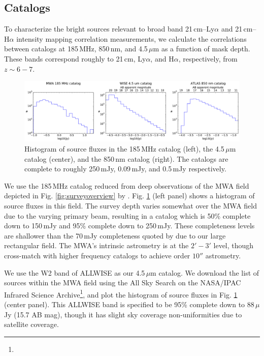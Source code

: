 \documentclass[numberedappendix]{emulateapj}
\begin{document}
\subsection{Catalogs}
\label{sec:catalogs}

To characterize the bright sources relevant to broad band  21\,cm--Ly$\alpha$ and  21\,cm--H$\alpha$ intensity mapping correlation measurements, we calculate the correlations between catalogs at 185\,MHz, 850\,nm, and 4.5\,$\mu$m as a function of mask depth. These bands correspond roughly to 21\,cm, Ly$\alpha$, and H$\alpha$, respectively, from $z\sim6-7$. 

\begin{figure}[t]
\centering
\includegraphics[width=6.5in]{catalog_histograms.pdf}
\caption[Histogram of source fluxes in the 185\,MHz, 850\,nm, and 4.5\,$\mu$m catalogs.]{Histogram of source fluxes in the 185\,MHz catalog (left), the 4.5\,$\mu$m catalog (center), and the 850\,nm catalog (right). The catalogs are complete to roughly 250\,mJy, 0.09\,mJy, and 0.5\,mJy respectively.}
\label{fig:cataloghistograms}
\end{figure}

We use the 185\,MHz catalog reduced from deep observations of the MWA field depicted in Fig. \ref{fig:surveyoverview} by \citet{PattiCatalog1}. Fig. \ref{fig:cataloghistograms} (left panel) shows a histogram of source fluxes in this field. The survey depth varies somewhat over the MWA field due to the varying primary beam, resulting in a catalog which is 50\% complete down to 150\,mJy and 95\% complete down to 250\,mJy. These completeness levels are shallower than the 70\,mJy completeness quoted by \citet{PattiCatalog1} due to our large rectangular field. The MWA's intrinsic astrometry is at the $2'-3'$ level, though \citep{PattiCatalog1} cross-match with higher frequency catalogs to achieve order $10''$ astrometry. 

We use the W2 band of ALLWISE \citep{Wright2010,allwise} as our 4.5\,$\mu$m catalog. We download the list of sources within the MWA field using the All Sky Search on the NASA/IPAC Infrared Science Archive\footnote{}, and plot the histogram of source fluxes in Fig. \ref{fig:cataloghistograms} (center panel). This ALLWISE band is specified to be 95\% complete down to 88\,$\mu$Jy (15.7 AB mag), though it has slight sky coverage non-uniformities due to satellite coverage.
\end{document}
